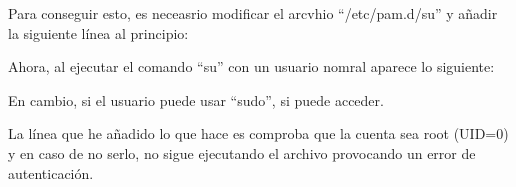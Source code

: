 \documentclass{article}
\begin{document}
Para conseguir esto, es neceasrio modificar el arcvhio ``/etc/pam.d/su'' y añadir la siguiente línea al principio:


Ahora, al ejecutar el comando ``su'' con un usuario nomral aparece lo siguiente:



En cambio, si el usuario puede usar ``sudo'', si puede acceder.


La línea que he añadido lo que hace es comproba que la cuenta sea root (UID=0) y en caso de no serlo, no sigue ejecutando el archivo provocando un error de autenticación.
\end{document}
